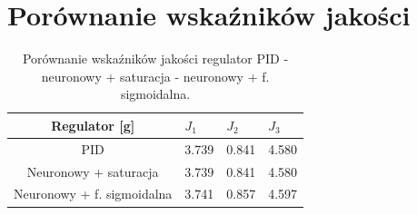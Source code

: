 \section{Porównanie wska\'zników jakości}
\begin{table}[h]
	\caption{Porównanie wska\'zników jakości regulator PID - neuronowy + saturacja - neuronowy + f. sigmoidalna.}
	\label{por_reg_pid_n_n}
	\centering
	
	\begin{tabular}{|c|M{2.5cm}|M{2.5cm}|M{2.5cm}|}
		\hline
		Regulator [g]&$J_1$&$J_2$&$J_3$\\
		\hline
		PID &3.739&   0.841 &  4.580\\
		\hline
		Neuronowy + saturacja &3.739 &  0.841 &  4.580\\
		\hline
		Neuronowy + f. sigmoidalna & 3.741 &  0.857 &  4.597\\
		\hline
	\end{tabular}
\end{table}